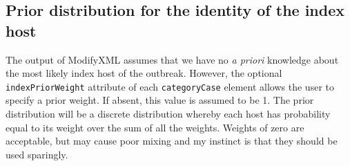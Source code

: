 \documentclass[]{article}
\begin{document}
\subsection*{Prior distribution for the identity of the index host}

The output of ModifyXML assumes that we have no \emph{a priori} knowledge about the most likely index host of the outbreak. However, the optional {\tt indexPriorWeight} attribute of each {\tt categoryCase} element allows the user to specify a prior weight. If absent, this value is assumed to be 1. The prior distribution will be a discrete distribution whereby each host has probability equal to its weight over the sum of all the weights. Weights of zero are acceptable, but may cause poor mixing and my instinct is that they should be used sparingly. 
\end{document}
